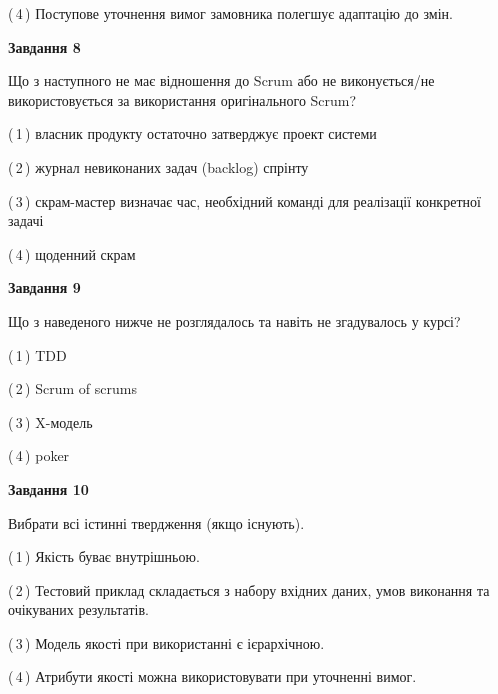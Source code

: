 \documentclass[10pt, ukrainian]{article}
\begin{document}
{\begin {large}
(\,4\,) Поступове уточнення вимог замовника полегшує адаптацію до змін. %


{\begin {center}\textbf{Завдання 8}\end {center}}\par
Що з наступного не має відношення до Scrum або не виконується/не використовується за використання оригінального Scrum?\par
\vspace{2mm}



(\,1\,) власник продукту остаточно затверджує проект системи%



(\,2\,) журнал невиконаних задач (backlog) спрінту%



(\,3\,) скрам-мастер визначає час, необхідний команді для реалізації конкретної задачі%



(\,4\,) щоденний скрам%


{\begin {center}\textbf{Завдання 9}\end {center}}\par
Що з наведеного нижче не розглядалось та навіть не згадувалось у курсі?\par
\vspace{2mm}



(\,1\,) TDD%



(\,2\,) Scrum of scrums%



(\,3\,) X-модель%



(\,4\,) poker%


{\begin {center}\textbf{Завдання 10}\end {center}}\par
Вибрати всі істинні твердження (якщо існують).\par
\vspace{2mm}



(\,1\,) Якість буває внутрішньою.%



(\,2\,) Тестовий приклад складається з набору вхідних даних, умов виконання та очікуваних результатів.%



(\,3\,) Модель якості при використанні є ієрархічною.%



(\,4\,) Атрибути якості можна використовувати при уточненні вимог.%



\end {large}}
\end{document}
